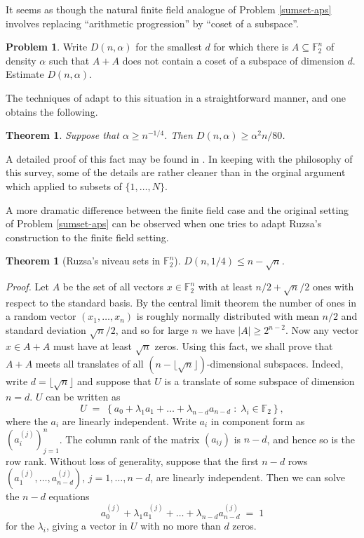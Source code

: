 \documentclass[12pt,a4paper,reqno]{amsart}
\numberwithin{equation}{section}
\theoremstyle{plain}
\newtheorem{theorem}[subsection]{Theorem}
\theoremstyle{definition}
\newtheorem{problem}[subsection]{Problem}
\renewcommand{\leq}{\leqslant}
\renewcommand{\geq}{\geqslant}
\def\proof{\noindent\textit{Proof. }}
\def\endproof{\hfill{\usebox{\proofbox}}}
\begin{document}
\noindent It seems as though the natural finite field analogue of Problem \ref{sumset-aps} involves replacing ``arithmetic progression'' by ``coset of a subspace''.
\begin{problem}\label{sumset-hyperplane}
Write $D(n,\alpha)$ for the smallest $d$ for which there is $A \subseteq \mathbb{F}_2^n$ of density $\alpha$ such that $A + A$ does not contain a coset of a subspace of dimension $d$. Estimate $D(n,\alpha)$.
\end{problem}

\noindent The techniques of \cite{green-aps-sumsets} adapt to this situation in a straightforward manner, and one obtains the following.

\begin{theorem}\label{thm9.3} Suppose that $\alpha \geq n^{-1/4}$. Then $D(n,\alpha) \geq \alpha^2 n/80$.
\end{theorem}

\noindent A detailed proof of this fact may be found in \cite{green-rkpnotes}. In keeping with the philosophy of this survey, some of the details are rather cleaner than in the orginal argument \cite{green-aps-sumsets} which applied to subsets of $\{1,\dots,N\}$.\vspace{11pt}

\noindent A more dramatic difference between the finite field case and the original setting of Problem \ref{sumset-aps} can be observed when one tries to adapt Ruzsa's construction to the finite field setting. 

\begin{theorem}[Ruzsa's niveau sets in $\mathbb{F}_2^n$]\label{ruz-niv}
$D(n,1/4) \leq n - \sqrt{n}$.
\end{theorem} 
\proof 
 Let $A$ be the set of all vectors $x \in \mathbb{F}_2^n$ with at least $n/2 + \sqrt{n}/2$ ones with respect to the standard basis. By the central limit theorem the number of ones in a random vector $(x_1,\dots,x_n)$ is roughly normally distributed with mean $n/2$ and standard deviation $\sqrt{n}/2$, and so for large $n$ we have $|A| \geq 2^{n-2}$. Now any vector $x \in A + A$ must have at least $\sqrt{n}$ zeros. Using this fact, we shall prove that $A + A$ meets all translates of all $(n - \lfloor\sqrt{n}\rfloor)$-dimensional subspaces. Indeed, write $d = \lfloor\sqrt{n}\rfloor$ and suppose that $U$ is a translate of some subspace of dimension $n = d$. $U$ can be written as
\[ U \; = \; \left\{a_0 + \lambda_1a_1 + \dots + \lambda_{n-d}a_{n-d} \; : \; \lambda_i \in \mathbb{F}_2\right\},\] where the $a_i$ are linearly independent. Write $a_i$ in component form as $(a_i^{(j)})_{j = 1}^n$. The column rank of the matrix $(a_{ij})$ is $n - d$, and hence so is the row rank. Without loss of generality, suppose that the first $n - d$ rows $(a_1^{(j)},\dots,a_{n-d}^{(j)})$, $j = 1,\dots,n-d$, are linearly independent. Then we can solve the $n - d$ equations
\[ a_0^{(j)} + \lambda_1a_1^{(j)} + \dots + \lambda_{n-d}a_{n-d}^{(j)} \; = \; 1\] for the $\lambda_i$, giving a vector in $U$ with no more than $d$ zeros.\endproof
\end{document}

